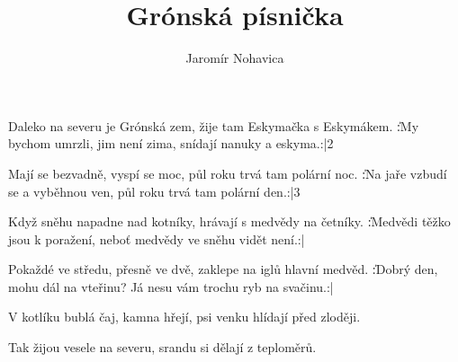 \beginsong

\title{Grónská písnička}
\author{Jaromír Nohavica}

\beginverse
Daleko na severu je Grónská zem,
žije tam Eskymačka s Eskymákem.
\|:My bychom umrzli, jim není zima,
snídají nanuky a eskyma.:|{2}
\endverse

\beginverse
Mají se bezvadně, vyspí se moc,
půl roku trvá tam polární noc.
\|:Na jaře vzbudí se a vyběhnou ven,
půl roku trvá tam polární den.:|3
\endverse

\beginverse
Když sněhu napadne nad kotníky,
hrávají s medvědy na četníky.
\|:Medvědi těžko jsou k poražení,
neboť medvědy ve sněhu vidět není.:|{}
\endverse

\beginverse
Pokaždé ve středu, přesně ve dvě,
zaklepe na iglů hlavní medvěd.
\|:Dobrý den, mohu dál na vteřinu?
Já nesu vám trochu ryb na svačinu.:|
\endverse

\beginverse
V kotlíku bublá čaj, kamna hřejí,
psi venku hlídají před zloději.
\endverse

\beginverse
Tak žijou vesele na severu,
srandu si dělají z teploměrů.
\endverse


